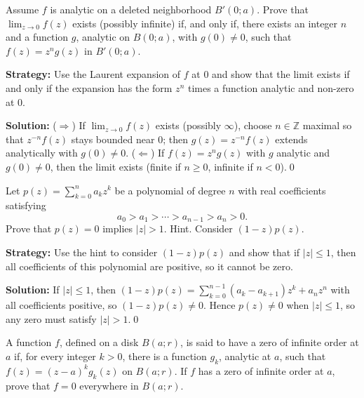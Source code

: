 \begin{problembox}
Assume \( f \) is analytic on a deleted neighborhood \( B'(0; a) \). Prove that \( \lim_{z \to 0} f(z) \) exists (possibly infinite) if, and only if, there exists an integer \( n \) and a function \( g \), analytic on \( B(0; a) \), with \( g(0) \neq 0 \), such that \( f(z) = z^n g(z) \) in \( B'(0; a) \).
\end{problembox}

\noindent\textbf{Strategy:} Use the Laurent expansion of \( f \) at \( 0 \) and show that the limit exists if and only if the expansion has the form \( z^n \) times a function analytic and non-zero at \( 0 \).

\bigskip\noindent\textbf{Solution:}
($\Rightarrow$) If $\lim_{z\to0}f(z)$ exists (possibly $\infty$), choose $n\in\mathbb Z$ maximal so that $z^{-n}f(z)$ stays bounded near $0$; then $g(z)=z^{-n}f(z)$ extends analytically with $g(0)\ne0$.
($\Leftarrow$) If $f(z)=z^n g(z)$ with $g$ analytic and $g(0)\ne0$, then the limit exists (finite if $n\ge0$, infinite if $n<0$).\qed


\begin{problembox}
Let \( p(z) = \sum_{k=0}^n a_k z^k \) be a polynomial of degree \( n \) with real coefficients satisfying
\[a_0 > a_1 > \cdots > a_{n-1} > a_n > 0.\]
Prove that \( p(z) = 0 \) implies \( |z| > 1 \). Hint. Consider \( (1 - z)p(z) \).
\end{problembox}

\noindent\textbf{Strategy:} Use the hint to consider \( (1-z)p(z) \) and show that if \( |z| \leq 1 \), then all coefficients of this polynomial are positive, so it cannot be zero.

\bigskip\noindent\textbf{Solution:}
If $|z|\le1$, then $(1-z)p(z)=\sum_{k=0}^{n-1}(a_k-a_{k+1})z^k+a_n z^n$ with all coefficients positive, so $(1-z)p(z)\ne0$. Hence $p(z)\ne0$ when $|z|\le1$, so any zero must satisfy $|z|>1$.\qed


\begin{problembox}
A function \( f \), defined on a disk \( B(a; r) \), is said to have a zero of infinite order at \( a \) if, for every integer \( k > 0 \), there is a function \( g_k \), analytic at \( a \), such that \( f(z) = (z - a)^k g_k(z) \) on \( B(a; r) \). If \( f \) has a zero of infinite order at \( a \), prove that \( f = 0 \) everywhere in \( B(a; r) \).
\end{problembox}

